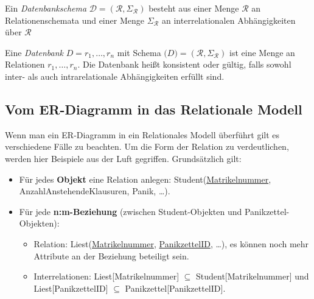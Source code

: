 \documentclass[a4paper,parskip=half*,DIV=15,fontsize=11pt]{scrartcl}
\begin{document}

Ein \textit{Datenbankschema} $\mathcal{D} = (\mathcal{R}, \Sigma_\mathcal{R})$ besteht aus einer Menge $\mathcal{R}$ an Relationenschemata und einer Menge $\Sigma_\mathcal{R}$ an interrelationalen Abhängigkeiten über $\mathcal{R}$

Eine \textit{Datenbank} $D = {r_1, \ldots , r_n}$ mit Schema $\mathcal(D) = (\mathcal{R}, \Sigma_\mathcal{R})$ ist eine Menge an Relationen $r_1, \ldots, r_n$. Die Datenbank heißt konsistent oder gültig, falls sowohl inter- als auch intrarelationale Abhängigkeiten erfüllt sind.

\subsection{Vom ER-Diagramm in das Relationale Modell}
Wenn man ein ER-Diagramm in ein Relationales Modell überführt gilt es verschiedene Fälle zu beachten. Um die Form der Relation zu verdeutlichen, werden hier Beispiele aus der Luft gegriffen. Grundsätzlich gilt:

\begin{itemize}
  \item Für jedes \textbf{Objekt} eine Relation anlegen: Student(\underline{Matrikelnummer}, AnzahlAnstehendeKlausuren, Panik, \ldots).
  \item Für jede \textbf{n:m-Beziehung} (zwischen Student-Objekten und Panikzettel-Objekten):
    \begin{itemize}
      \item Relation: Liest(\underline{Matrikelnummer}, \underline{PanikzettelID}, \ldots), es können noch mehr Attribute an der Beziehung beteiligt sein.
      \item Interrelationen: Liest[Matrikelnummer] $\subseteq$ Student[Matrikelnummer] und Liest[PanikzettelID] $\subseteq$ Panikzettel[PanikzettelID].
    \end{itemize}
\end{itemize}
\end{document}
